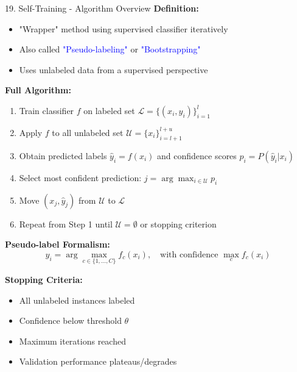 \documentclass[8pt]{beamer}
\begin{document}
	\begin{frame}{19. Self-Training - Algorithm Overview}
		\fontsize{6.5}{7.5}\selectfont
		\textbf{Definition:}
		\begin{itemize}
			\item "Wrapper" method using supervised classifier iteratively
			\item Also called \textcolor{blue}{"Pseudo-labeling"} or \textcolor{blue}{"Bootstrapping"}
			\item Uses unlabeled data from a supervised perspective
		\end{itemize}
		
		\textbf{Full Algorithm:}
		
		\begin{enumerate}
			\item Train classifier $f$ on labeled set $\mathcal{L} = \{(x_i, y_i)\}_{i=1}^l$
			\item Apply $f$ to all unlabeled set $\mathcal{U} = \{x_i\}_{i=l+1}^{l+u}$
			\item Obtain predicted labels $\hat{y}_i = f(x_i)$ and confidence scores $p_i = P(\hat{y}_i | x_i)$
			\item Select most confident prediction: $j = \arg\max_{i \in \mathcal{U}} p_i$
			\item Move $(x_j, \hat{y}_j)$ from $\mathcal{U}$ to $\mathcal{L}$
			\item Repeat from Step 1 until $\mathcal{U} = \emptyset$ or stopping criterion
		\end{enumerate}
		
		\textbf{Pseudo-label Formalism:}
		\[
		\hat{y}_i = \arg\max_{c \in \{1,...,C\}} f_c(x_i), \quad \text{with confidence } \max_c f_c(x_i)
		\]
		
		\textbf{Stopping Criteria:}
		\begin{itemize}
			\item All unlabeled instances labeled
			\item Confidence below threshold $\theta$
			\item Maximum iterations reached
			\item Validation performance plateaus/degrades
		\end{itemize}
	\end{frame}
	
\end{document}

